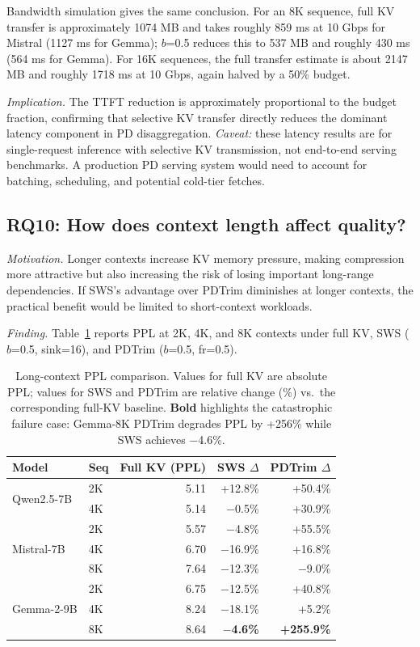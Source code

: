 \documentclass[11pt]{article}
\newcommand{\method}{SWS}
\newcommand{\sws}{SWS}
\newcommand{\pct}{\%}
\theoremstyle{definition}
\theoremstyle{plain}
\begin{document}
Bandwidth simulation gives the same conclusion.  For an 8K sequence, full KV transfer is approximately 1074 MB and takes roughly 859 ms at 10 Gbps for Mistral (1127 ms for Gemma); $b$=0.5 reduces this to 537 MB and roughly 430 ms (564 ms for Gemma).  For 16K sequences, the full transfer estimate is about 2147 MB and roughly 1718 ms at 10 Gbps, again halved by a 50\pct{} budget.

\emph{Implication.}  The TTFT reduction is approximately proportional to the budget fraction, confirming that selective KV transfer directly reduces the dominant latency component in PD disaggregation.  \emph{Caveat:} these latency results are for single-request inference with selective KV transmission, not end-to-end serving benchmarks.  A production PD serving system would need to account for batching, scheduling, and potential cold-tier fetches.

\subsection{RQ10: How does context length affect quality?}
\label{sec:rq10}

\emph{Motivation.}  Longer contexts increase KV memory pressure, making compression more attractive but also increasing the risk of losing important long-range dependencies.  If \method{}'s advantage over PDTrim diminishes at longer contexts, the practical benefit would be limited to short-context workloads.

\emph{Finding.}  Table~\ref{tab:long-context} reports PPL at 2K, 4K, and 8K contexts under full KV, \sws{} ($b$=0.5, sink=16), and PDTrim ($b$=0.5, fr=0.5).

\begin{table}[t]
\centering
\caption{Long-context PPL comparison.  Values for full KV are absolute PPL; values for \sws{} and PDTrim are relative change (\%) vs.\ the corresponding full-KV baseline.  \textbf{Bold} highlights the catastrophic failure case: Gemma-8K PDTrim degrades PPL by +256\pct{} while \sws{} achieves $-$4.6\pct{}.}
\label{tab:long-context}
\small
\begin{tabular}{llrrr}
\toprule
Model & Seq & Full KV (PPL) & \sws{} $\Delta$ & PDTrim $\Delta$ \\
\midrule
\multirow{2}{*}{Qwen2.5-7B} & 2K & 5.11 & +12.8\pct{} & +50.4\pct{} \\
 & 4K & 5.14 & $-$0.5\pct{} & +30.9\pct{} \\
\midrule
\multirow{3}{*}{Mistral-7B} & 2K & 5.57 & $-$4.8\pct{} & +55.5\pct{} \\
 & 4K & 6.70 & $-$16.9\pct{} & +16.8\pct{} \\
 & 8K & 7.64 & $-$12.3\pct{} & $-$9.0\pct{} \\
\midrule
\multirow{3}{*}{Gemma-2-9B} & 2K & 6.75 & $-$12.5\pct{} & +40.8\pct{} \\
 & 4K & 8.24 & $-$18.1\pct{} & +5.2\pct{} \\
 & 8K & 8.64 & \textbf{$-$4.6\pct{}} & \textbf{+255.9\pct{}} \\
\bottomrule
\end{tabular}
\end{table}
\end{document}
